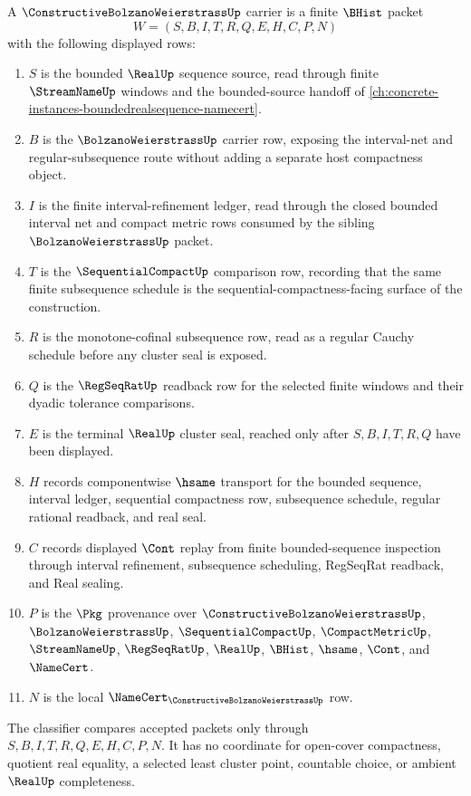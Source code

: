 \begin{definition}
\label{def:constructive-bolzano-weierstrass-carrier}
A $\ConstructiveBolzanoWeierstrassUp$ carrier is a finite $\BHist$ packet
$$
W=(S,B,I,T,R,Q,E,H,C,P,N)
$$
with the following displayed rows:
\begin{enumerate}
\item $S$ is the bounded $\RealUp$ sequence source, read through finite $\StreamNameUp$ windows and the bounded-source handoff of \autoref{ch:concrete-instances-boundedrealsequence-namecert}.
\item $B$ is the $\BolzanoWeierstrassUp$ carrier row, exposing the interval-net and regular-subsequence route without adding a separate host compactness object.
\item $I$ is the finite interval-refinement ledger, read through the closed bounded interval net and compact metric rows consumed by the sibling $\BolzanoWeierstrassUp$ packet.
\item $T$ is the $\SequentialCompactUp$ comparison row, recording that the same finite subsequence schedule is the sequential-compactness-facing surface of the construction.
\item $R$ is the monotone-cofinal subsequence row, read as a regular Cauchy schedule before any cluster seal is exposed.
\item $Q$ is the $\RegSeqRatUp$ readback row for the selected finite windows and their dyadic tolerance comparisons.
\item $E$ is the terminal $\RealUp$ cluster seal, reached only after $S,B,I,T,R,Q$ have been displayed.
\item $H$ records componentwise $\hsame$ transport for the bounded sequence, interval ledger, sequential compactness row, subsequence schedule, regular rational readback, and real seal.
\item $C$ records displayed $\Cont$ replay from finite bounded-sequence inspection through interval refinement, subsequence scheduling, RegSeqRat readback, and Real sealing.
\item $P$ is the $\Pkg$ provenance over $\ConstructiveBolzanoWeierstrassUp$, $\BolzanoWeierstrassUp$, $\SequentialCompactUp$, $\CompactMetricUp$, $\StreamNameUp$, $\RegSeqRatUp$, $\RealUp$, $\BHist$, $\hsame$, $\Cont$, and $\NameCert$.
\item $N$ is the local $\NameCert_{\ConstructiveBolzanoWeierstrassUp}$ row.
\end{enumerate}
The classifier compares accepted packets only through $S,B,I,T,R,Q,E,H,C,P,N$. It has no coordinate for open-cover compactness, quotient real equality, a selected least cluster point, countable choice, or ambient $\RealUp$ completeness.
\end{definition}

